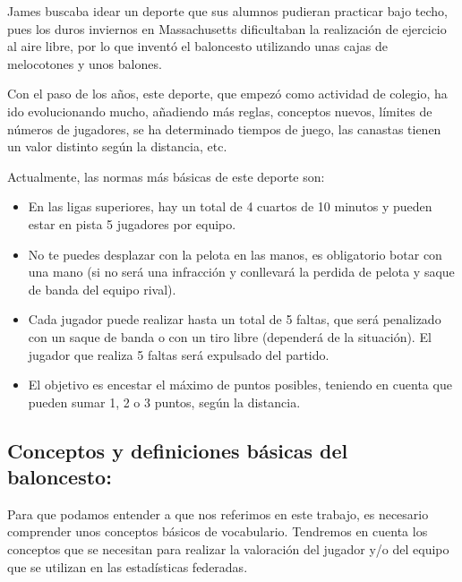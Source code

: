 \documentclass[paper=a4, fontsize=9pt]{article}
\begin{document}
James buscaba idear un deporte que sus alumnos pudieran practicar bajo techo, pues los duros inviernos en Massachusetts dificultaban la realización de ejercicio al aire libre, por lo que inventó el baloncesto utilizando unas cajas de melocotones y unos balones. 

Con el paso de los años, este deporte, que empezó como actividad de colegio, ha ido evolucionando mucho, añadiendo más reglas, conceptos nuevos, límites de números de jugadores, se ha determinado tiempos de juego, las canastas tienen un valor distinto según la distancia, etc.

Actualmente, las normas más básicas de este deporte son:
  
\begin{itemize}

  \item En las ligas superiores, hay un total de 4 cuartos de 10 minutos y pueden estar en pista 5 jugadores por equipo.
  \item No te puedes desplazar con la pelota en las manos, es obligatorio botar con una mano (si no será una infracción y conllevará la perdida de pelota y saque de banda del equipo rival).
  \item Cada jugador puede realizar hasta un total de 5 faltas, que será penalizado con un saque de banda o con un tiro libre (dependerá de la situación). El jugador que realiza 5 faltas será expulsado del partido.
  \item El objetivo es encestar el máximo de puntos posibles, teniendo en cuenta que pueden sumar 1, 2 o 3 puntos, según la distancia.

\end{itemize}

\clearpage

\subsection{Conceptos y definiciones básicas del baloncesto:}

Para que podamos entender a que nos referimos en este trabajo, es necesario comprender unos conceptos básicos de vocabulario. Tendremos en cuenta los conceptos que se necesitan para realizar la valoración del jugador y/o del equipo que se utilizan en las estadísticas federadas.
\end{document}
